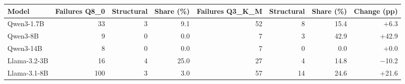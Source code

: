 \begin{tabular}{@{}lrrrrrrr@{}}
\toprule
Model & Failures Q8\_0 & Structural & Share (\%) & Failures Q3\_K\_M & Structural & Share (\%) & Change (pp) \\
\midrule
Qwen3-1.7B & 33 & 3 & 9.1 & 52 & 8 & 15.4 & $+$6.3 \\
Qwen3-8B & 9 & 0 & 0.0 & 7 & 3 & 42.9 & $+$42.9 \\
Qwen3-14B & 8 & 0 & 0.0 & 7 & 0 & 0.0 & $+$0.0 \\
Llama-3.2-3B & 16 & 4 & 25.0 & 27 & 4 & 14.8 & $-$10.2 \\
Llama-3.1-8B & 100 & 3 & 3.0 & 57 & 14 & 24.6 & $+$21.6 \\
\bottomrule
\end{tabular}
